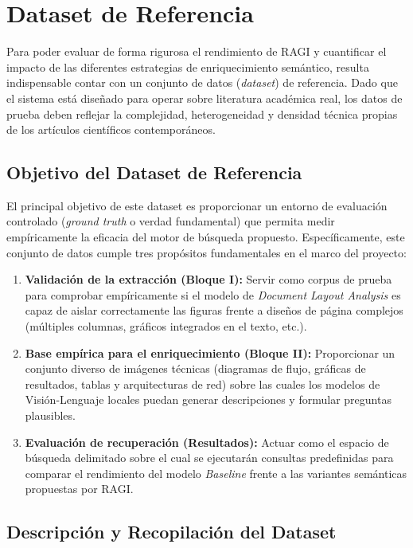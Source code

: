 \documentclass[a4paper]{report}
\begin{document}
\section{Dataset de Referencia}
\label{sec:metodologia_dataset}

Para poder evaluar de forma rigurosa el rendimiento de RAGI y cuantificar el impacto de las diferentes estrategias de enriquecimiento semántico, resulta indispensable contar con un conjunto de datos (\textit{dataset}) de referencia. Dado que el sistema está diseñado para operar sobre literatura académica real, los datos de prueba deben reflejar la complejidad, heterogeneidad y densidad técnica propias de los artículos científicos contemporáneos.

\subsection{Objetivo del Dataset de Referencia}

El principal objetivo de este dataset es proporcionar un entorno de evaluación controlado (\textit{ground truth} o verdad fundamental) que permita medir empíricamente la eficacia del motor de búsqueda propuesto. Específicamente, este conjunto de datos cumple tres propósitos fundamentales en el marco del proyecto:

\begin{enumerate}
    \item \textbf{Validación de la extracción (Bloque I):} Servir como corpus de prueba para comprobar empíricamente si el modelo de \textit{Document Layout Analysis} es capaz de aislar correctamente las figuras frente a diseños de página complejos (múltiples columnas, gráficos integrados en el texto, etc.).
    \item \textbf{Base empírica para el enriquecimiento (Bloque II):} Proporcionar un conjunto diverso de imágenes técnicas (diagramas de flujo, gráficas de resultados, tablas y arquitecturas de red) sobre las cuales los modelos de Visión-Lenguaje locales puedan generar descripciones y formular preguntas plausibles.
    \item \textbf{Evaluación de recuperación (Resultados):} Actuar como el espacio de búsqueda delimitado sobre el cual se ejecutarán consultas predefinidas para comparar el rendimiento del modelo \textit{Baseline} frente a las variantes semánticas propuestas por RAGI.
\end{enumerate}

\subsection{Descripción y Recopilación del Dataset}
\end{document}
